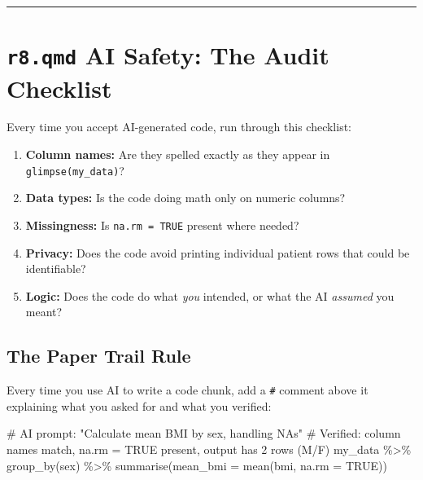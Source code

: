 \documentclass[
  letterpaper,
  DIV=11,
  numbers=noendperiod,
  oneside]{scrreprt}
\newenvironment{Shaded}{\begin{snugshade}}{\end{snugshade}}
\newcommand{\AttributeTok}[1]{\textcolor[rgb]{0.40,0.45,0.13}{#1}}
\newcommand{\CommentTok}[1]{\textcolor[rgb]{0.37,0.37,0.37}{#1}}
\newcommand{\ConstantTok}[1]{\textcolor[rgb]{0.56,0.35,0.01}{#1}}
\newcommand{\FunctionTok}[1]{\textcolor[rgb]{0.28,0.35,0.67}{#1}}
\newcommand{\NormalTok}[1]{\textcolor[rgb]{0.00,0.23,0.31}{#1}}
\newcommand{\SpecialCharTok}[1]{\textcolor[rgb]{0.37,0.37,0.37}{#1}}
\providecommand{\tightlist}{%
  \setlength{\itemsep}{0pt}\setlength{\parskip}{0pt}}
\begin{document}
\begin{center}\rule{0.5\linewidth}{0.5pt}\end{center}

\section*{\texorpdfstring{\texttt{r8.qmd} AI Safety: The Audit
Checklist}{r8.qmd AI Safety: The Audit Checklist}}\label{r8.qmd-ai-safety-the-audit-checklist}


Every time you accept AI-generated code, run through this checklist:

\begin{enumerate}
\def\labelenumi{\arabic{enumi}.}
\tightlist
\item
  \textbf{Column names:} Are they spelled exactly as they appear in
  \texttt{glimpse(my\_data)}?
\item
  \textbf{Data types:} Is the code doing math only on numeric columns?
\item
  \textbf{Missingness:} Is \texttt{na.rm\ =\ TRUE} present where needed?
\item
  \textbf{Privacy:} Does the code avoid printing individual patient rows
  that could be identifiable?
\item
  \textbf{Logic:} Does the code do what \emph{you} intended, or what the
  AI \emph{assumed} you meant?
\end{enumerate}

\subsection*{The Paper Trail Rule}\label{the-paper-trail-rule}

Every time you use AI to write a code chunk, add a \texttt{\#} comment
above it explaining what you asked for and what you verified:

\begin{Shaded}
\begin{Highlighting}[numbers=left,,]
\CommentTok{\# AI prompt: "Calculate mean BMI by sex, handling NAs"}
\CommentTok{\# Verified: column names match, na.rm = TRUE present, output has 2 rows (M/F)}
\NormalTok{my\_data }\SpecialCharTok{\%\textgreater{}\%}
  \FunctionTok{group\_by}\NormalTok{(sex) }\SpecialCharTok{\%\textgreater{}\%}
  \FunctionTok{summarise}\NormalTok{(}\AttributeTok{mean\_bmi =} \FunctionTok{mean}\NormalTok{(bmi, }\AttributeTok{na.rm =} \ConstantTok{TRUE}\NormalTok{))}
\end{Highlighting}
\end{Shaded}
\end{document}
